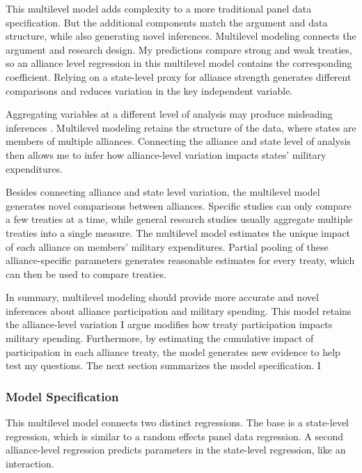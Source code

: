 \documentclass[12pt]{article}
\begin{document}
This multilevel model adds complexity to a more traditional panel data specification. 
But the additional components match the argument and data structure, while also generating novel inferences. 
Multilevel modeling connects the argument and research design. 
My predictions compare strong and weak treaties, so an alliance level regression in this multilevel model contains the corresponding coefficient.
Relying on a state-level proxy for alliance strength generates different comparisons and reduces variation in the key independent variable.


Aggregating variables at a different level of analysis may produce misleading inferences \citep{McElreath2016}. 
Multilevel modeling retains the structure of the data, where states are members of multiple alliances. 
Connecting the alliance and state level of analysis then allows me to infer how alliance-level variation impacts states' military expenditures. 


Besides connecting alliance and state level variation, the multilevel model generates novel comparisons between alliances. 
Specific studies can only compare a few treaties at a time, while general research studies usually aggregate multiple treaties into a single measure. 
The multilevel model estimates the unique impact of each alliance on members' military expenditures. 
Partial pooling of these alliance-specific parameters generates reasonable estimates for every treaty, which can then be used to compare treaties. 


In summary, multilevel modeling should provide more accurate and novel inferences about alliance participation and military spending. 
This model retains the alliance-level variation I argue modifies how treaty participation impacts military spending. 
Furthermore, by estimating the cumulative impact of participation in each alliance treaty, the model generates new evidence to help test my questions. 
The next section summarizes the model specification. 
I 


\subsubsection{Model Specification} 

This multilevel model connects two distinct regressions. 
The base is a state-level regression, which is similar to a random effects panel data regression.
A second alliance-level regression predicts parameters in the state-level regression, like an interaction. 
\end{document}
